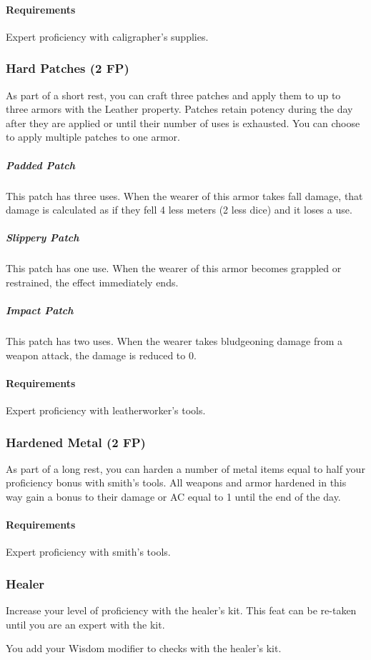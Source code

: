     \paragraph{Requirements} Expert proficiency with caligrapher's supplies.
\subsubsection{Hard Patches (2 FP)} \label{feat::hardpatches}
    As part of a short rest, you can craft three patches and apply them to up to three armors with the Leather property.
    Patches retain potency during the day after they are applied or until their number of uses is exhausted.
    You can choose to apply multiple patches to one armor.
    \subparagraph{Padded Patch} This patch has three uses.
    When the wearer of this armor takes fall damage, that damage is calculated as if they fell 4 less meters (2 less dice) and it loses a use.
    \subparagraph{Slippery Patch} This patch has one use.
    When the wearer of this armor becomes grappled or restrained, the effect immediately ends.
    \subparagraph{Impact Patch} This patch has two uses.
    When the wearer takes bludgeoning damage from a weapon attack, the damage is reduced to 0.
    \paragraph{Requirements} Expert proficiency with leatherworker's tools.
\subsubsection{Hardened Metal (2 FP)} \label{feat::hardenedmetal}
    As part of a long rest, you can harden a number of metal items equal to half your proficiency bonus with smith's tools.
    All weapons and armor hardened in this way gain a bonus to their damage or AC equal to 1 until the end of the day.
    \paragraph{Requirements} Expert proficiency with smith's tools.
\subsubsection{Healer} \label{feat::healer}
    Increase your level of proficiency with the healer's kit.
    This feat can be re-taken until you are an expert with the kit.

    You add your Wisdom modifier to checks with the healer's kit.
